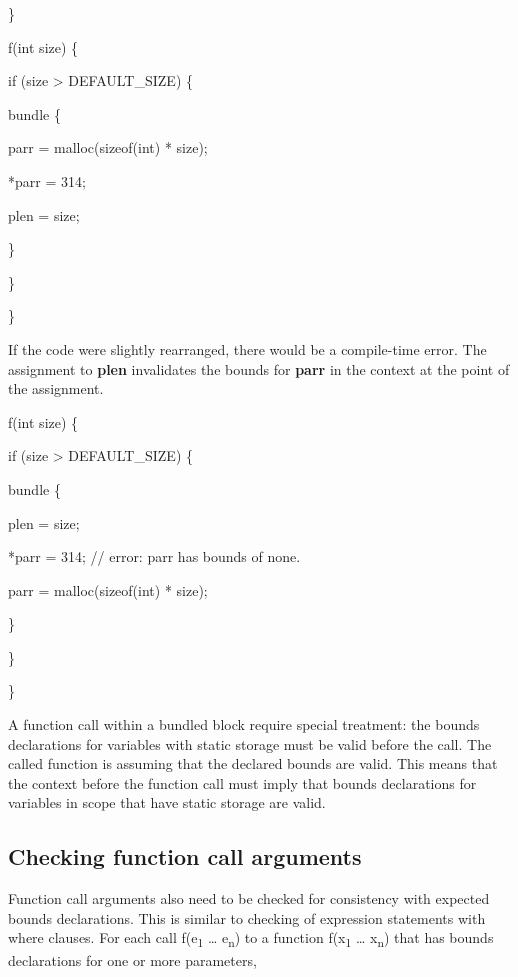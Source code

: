 \documentclass[]{article}
\begin{document}
\}

f(int size) \{

if (size \textgreater{} DEFAULT\_SIZE) \{

bundle \{

parr = malloc(sizeof(int) * size);

*parr = 314;

plen = size;

\}

\}

\}

If the code were slightly rearranged, there would be a compile-time
error. The assignment to \textbf{plen} invalidates the bounds for
\textbf{parr} in the context at the point of the assignment.

f(int size) \{

if (size \textgreater{} DEFAULT\_SIZE) \{

bundle \{

plen = size;

*parr = 314; // error: parr has bounds of none.

parr = malloc(sizeof(int) * size);

\}

\}

\}

A function call within a bundled block require special treatment: the
bounds declarations for variables with static storage must be valid
before the call. The called function is assuming that the declared
bounds are valid. This means that the context before the function call
must imply that bounds declarations for variables in scope that have
static storage are valid.

\subsection{\texorpdfstring{\protect\hypertarget{ux5fToc429559103}{}{\protect\hypertarget{ux5fToc435434963}{}{\protect\hypertarget{ux5fRef436930464}{}{\protect\hypertarget{ux5fRef436930924}{}{\protect\hypertarget{ux5fToc437460791}{}{\protect\hypertarget{ux5fToc440445472}{}{\protect\hypertarget{ux5fToc440449254}{}{\protect\hypertarget{ux5fToc440551904}{}{}}}}}}}}Checking
function call
arguments}{Checking function call arguments}}\label{checking-function-call-arguments}

Function call arguments also need to be checked for consistency with
expected bounds declarations. This is similar to checking of expression
statements with where clauses. For each call f(e\textsubscript{1}
\ldots{} e\textsubscript{n}) to a function f(x\textsubscript{1} \ldots{}
x\textsubscript{n}) that has bounds declarations for one or more
parameters,
\end{document}
